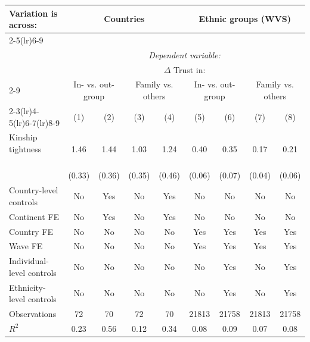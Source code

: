 {\begin{tabular}{l*{8}{c}}\toprule\toprule Variation is across:& \multicolumn{4}{c}{Countries} &\multicolumn{4}{c}{Ethnic groups (WVS)}\\\cmidrule(lr){2-5}\cmidrule(lr){6-9}\\ &\multicolumn{8}{c}{\textit{Dependent variable:}}\\ &\multicolumn{8}{c}{$\Delta$ Trust in:}\\\cmidrule(lr){2-9} &\multicolumn{2}{c}{In- vs. out-group} &\multicolumn{2}{c}{Family vs. others} &\multicolumn{2}{c}{In- vs. out-group} &\multicolumn{2}{c}{Family vs. others}   \\\cmidrule(lr){2-3}\cmidrule(lr){4-5}\cmidrule(lr){6-7}\cmidrule(lr){8-9}
                &\multicolumn{1}{c}{(1)}         &\multicolumn{1}{c}{(2)}         &\multicolumn{1}{c}{(3)}         &\multicolumn{1}{c}{(4)}         &\multicolumn{1}{c}{(5)}         &\multicolumn{1}{c}{(6)}         &\multicolumn{1}{c}{(7)}         &\multicolumn{1}{c}{(8)}         \\
\midrule
Kinship tightness $\qquad$&     1.46\sym{***}&     1.44\sym{***}&     1.03\sym{***}&     1.24\sym{***}&     0.40\sym{***}&     0.35\sym{***}&     0.17\sym{***}&     0.21\sym{***}\\
                &   (0.33)         &   (0.36)         &   (0.35)         &   (0.46)         &   (0.06)         &   (0.07)         &   (0.04)         &   (0.06)         \\
\addlinespace
Country-level controls&       No         &      Yes         &       No         &      Yes         &       No         &       No         &       No         &       No         \\
\addlinespace
Continent FE    &       No         &      Yes         &       No         &      Yes         &       No         &       No         &       No         &       No         \\
\addlinespace
Country FE      &       No         &       No         &       No         &       No         &      Yes         &      Yes         &      Yes         &      Yes         \\
\addlinespace
Wave FE         &       No         &       No         &       No         &       No         &      Yes         &      Yes         &      Yes         &      Yes         \\
\addlinespace
Individual-level controls&       No         &       No         &       No         &       No         &       No         &      Yes         &       No         &      Yes         \\
\addlinespace
Ethnicity-level controls&       No         &       No         &       No         &       No         &       No         &      Yes         &       No         &      Yes         \\
\midrule
Observations    &       72         &       70         &       72         &       70         &    21813         &    21758         &    21813         &    21758         \\
\(R^{2}\)       &     0.23         &     0.56         &     0.12         &     0.34         &     0.08         &     0.09         &     0.07         &     0.08         \\
\bottomrule
\end{tabular}
}
